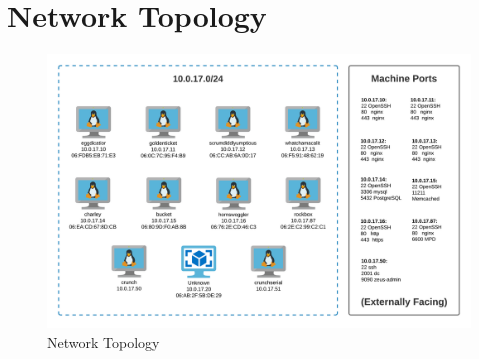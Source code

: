 \printbibliography
\newpage
\newpage
\appendix
\appendixpage
\addappheadtotoc

\section{Network Topology}
    \label{appendix:A}
    \begin{figure}[H]
        \centering
        \includegraphics[width=\textwidth]{images/general/topology.PNG}
        \caption{Network Topology}
        \label{fig:nettopology}
    \end{figure}

\newpage
